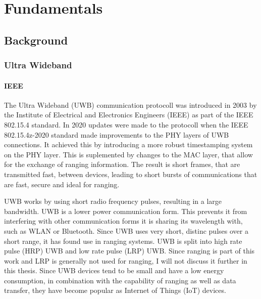 \chapter{Fundamentals}

\section{Background}


\subsection{Ultra Wideband}

\subsubsection{IEEE}

The Ultra Wideband (UWB) communication protocoll was introduced in 2003 by the Institute of Electrical and Electronics Engineers (IEEE) as part of the IEEE 802.15.4 standard.
In 2020 updates were made to the protocoll when the IEEE 802.15.4z-2020 standard made improvements to the PHY layers of UWB connections. %
It achieved this by introducing a more robust timestamping system on the PHY layer.
This is suplemented by changes to the MAC layer, that allow for the exchange of ranging information.
The result is short frames, that are transmitted fast, between devices, leading to short bursts of communications that are fast, secure and ideal for ranging.


UWB works by using short radio frequency pulses, resulting in a large bandwidth.
UWB is a lower power communication form.
This prevents it from interfering with other communication forms it is sharing its wavelength with, such as WLAN or Bluetooth. 
Since UWB uses very short, distinc pulses over a short range, it has found use in ranging systems. %
UWB is split into high rate pulse (HRP) UWB and low rate pulse (LRP) UWB.
Since ranging is part of this work and LRP is generally not used for ranging, I will not discuss it further in this thesis. %
Since UWB devices tend to be small and have a low energy consumption, in combination with the capability of ranging as well as data transfer, they have become popular as Internet of Things (IoT) devices. \\ 

